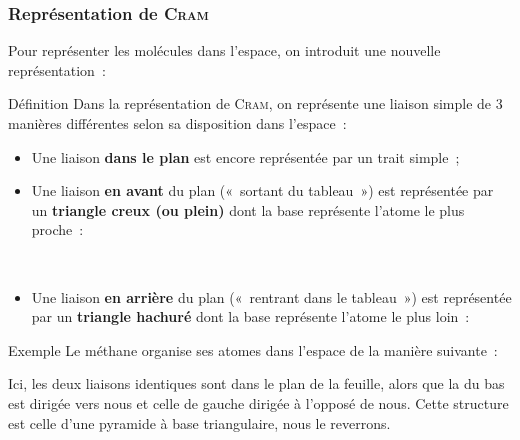 \documentclass[../main/main.tex]{subfiles}
\begin{document}
\subsubsection{Représentation de \textsc{Cram}}
Pour représenter les molécules dans l'espace, on introduit une nouvelle
représentation~:
\begin{tdefi}{Définition}
    Dans la représentation de \textsc{Cram}, on représente une liaison simple de
    3 manières différentes selon sa disposition dans l'espace~:
    \begin{itemize}
        \item Une liaison \textbf{dans le plan} est encore représentée par un
            trait simple~;
            \begin{center}
            \end{center}
        \item Une liaison \textbf{en avant} du plan («~sortant du tableau~») est
            représentée par un \textbf{triangle creux (ou plein)} dont la base
            représente l'atome le plus proche~:
            \begin{center}
                \hfill
                \hfill
                \qou
                \hfill
                \hfill~
            \end{center}
        \item Une liaison \textbf{en arrière} du plan («~rentrant dans le
            tableau~») est représentée par un \textbf{triangle hachuré} dont la
            base représente l'atome le plus loin~:
            \begin{center}
            \end{center}
    \end{itemize}
\end{tdefi}

\begin{rexem}{Exemple}
    Le méthane  organise ses atomes dans l'espace de la manière
    suivante~:
    \begin{center}
    \end{center}
    Ici, les deux liaisons  identiques sont dans le plan de la feuille,
    alors que la  du bas est dirigée vers nous et celle de gauche
    dirigée à l'opposé de nous. Cette structure est celle d'une pyramide à base
    triangulaire, nous le reverrons.
\end{rexem}
\end{document}
